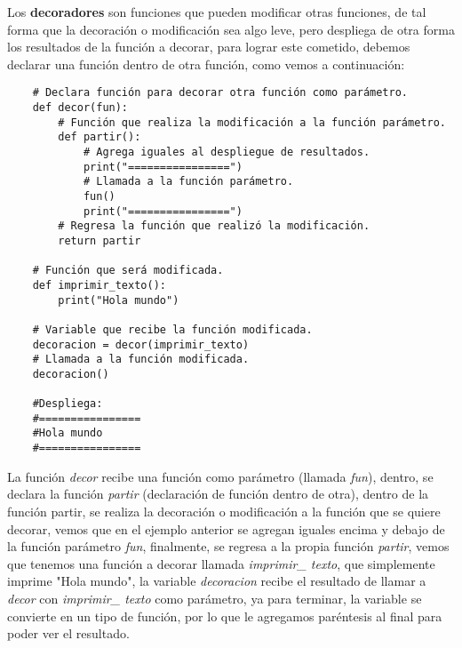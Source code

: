 Los \textbf{decoradores} son funciones que pueden modificar otras funciones, de tal forma que la decoración o modificación sea algo leve, pero despliega de otra forma los resultados de la función a decorar, para lograr este cometido, debemos declarar una función dentro de otra función, como vemos a continuación:
\begin{lstlisting}
    # Declara función para decorar otra función como parámetro.
    def decor(fun):
        # Función que realiza la modificación a la función parámetro.
        def partir():
            # Agrega iguales al despliegue de resultados.
            print("================")
            # Llamada a la función parámetro.
            fun()
            print("================")
        # Regresa la función que realizó la modificación.
        return partir

    # Función que será modificada.
    def imprimir_texto():
        print("Hola mundo")

    # Variable que recibe la función modificada.
    decoracion = decor(imprimir_texto)
    # Llamada a la función modificada.
    decoracion()

    #Despliega:
    #================
    #Hola mundo
    #================
\end{lstlisting}

La función \textit{decor} recibe una función como parámetro (llamada \textit{fun}), dentro, se declara la función \textit{partir} (declaración de función dentro de otra), dentro de la función partir, se realiza la decoración o modificación a la función que se quiere decorar, vemos que en el ejemplo anterior se agregan iguales encima y debajo de la función parámetro \textit{fun}, finalmente, se regresa a la propia función \textit{partir}, vemos que tenemos una función a decorar llamada \textit{imprimir\_ texto}, que simplemente imprime "Hola mundo", la variable \textit{decoracion} recibe el resultado de llamar a \textit{decor} con \textit{imprimir\_ texto} como parámetro, ya para terminar, la variable se convierte en un tipo de función, por lo que le agregamos paréntesis al final para poder ver el resultado.

